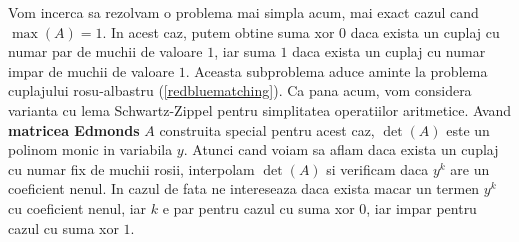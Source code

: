 Vom incerca sa rezolvam o problema mai simpla acum, mai exact cazul cand $\max(A) = 1$. In acest caz, putem obtine suma xor $0$ daca exista
un cuplaj cu numar par de muchii de valoare $1$, iar suma $1$ daca exista un cuplaj cu numar impar de muchii de valoare $1$. Aceasta subproblema
aduce aminte la problema cuplajului rosu-albastru (\ref{redbluematching}). Ca pana acum, vom considera varianta cu lema Schwartz-Zippel pentru
simplitatea operatiilor aritmetice. Avand \textbf{matricea Edmonds} $A$ construita special pentru acest caz,
$\det(A)$ este un polinom monic in variabila $y$. Atunci cand voiam sa aflam daca exista un cuplaj cu numar
fix de muchii rosii, interpolam $\det(A)$ si verificam daca $y^{k}$ are un coeficient nenul. In cazul de fata
ne intereseaza daca exista macar un termen $y^{k}$ cu coeficient nenul, iar $k$ e par pentru cazul cu suma
xor $0$, iar impar pentru cazul cu suma xor $1$.
